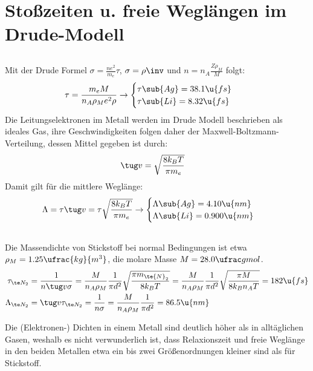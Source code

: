 \documentclass[exa]{exercise_5.0}
\begin{document}
\section{Stoßzeiten u. freie Weglängen im Drude-Modell}
\subsection{}
Mit der Drude Formel $\sigma = \frac{n e^2}{m_e}\tau$,  $\sigma = \rho\inv$ und $n = n_A\frac{Z\rho_M}{M}$ folgt:
\begin{align*}
    \tau &= \frac{m_e M }{n_A \rho_M e^2 \rho}
    \to  \begin{cases}
        \tau\sub{Ag} = 38.1 \u{fs}\\
        \tau\sub{Li} = 8.32\u{fs}
    \end{cases}
\end{align*}
Die Leitungselektronen im Metall werden im Drude Modell beschrieben als ideales Gas, ihre Geschwindigkeiten folgen daher der Maxwell-Boltzmann-Verteilung, dessen Mittel gegeben ist durch:
\begin{align*}
    \tug v &= \sqrt{\frac{8 k_B T}{\pi m_e}}
\end{align*}
Damit gilt für die mittlere Weglänge:
\begin{align*}
    \Lambda &= \tau \tug v = \tau \sqrt{\frac{8 k_B T}{\pi m_e}}\to
    \begin{cases}
        \Lambda\sub{Ag} = 4.10\u{nm}\\
        \Lambda\sub{Li} = 0.900\u{nm}
    \end{cases}
\end{align*}

\subsection{}
Die Massendichte von Stickstoff bei normal Bedingungen ist etwa $\rho_M=1.25\ufrac{kg}{m^3}$, die molare Masse $M = 28.0\ufrac g{mol}$.
\begin{align*}
    \tau_{\te N_2} &= \frac{1}{n\tug v \sigma} = \frac{M}{n_A \rho_M}\frac{1}{\pi d^2}\sqrt{\frac{\pi m_{\te{N}_2}}{8 k_B T}}
    = \frac{M}{n_A \rho_M}\frac{1}{\pi d^2}\sqrt{\frac{\pi M}{8 k_B n_A T}}
    = 182\u{fs}\\
    \Lambda_{\te N_2} &= \tug v \tau_{\te N_2} = \frac1{n\sigma} =\frac{M}{n_A \rho_M}\frac{1}{\pi d^2}  = 86.5\u{nm}
\end{align*}

Die (Elektronen-) Dichten in einem Metall sind deutlich höher als in alltäglichen Gasen, weshalb es nicht verwunderlich ist, dass Relaxionszeit und freie Weglänge in den beiden Metallen etwa ein bis zwei Größenordnungen kleiner sind als für Stickstoff.  
\end{document}
